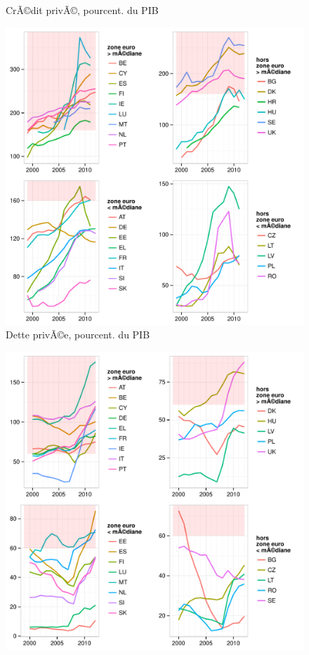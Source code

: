 \documentclass{article}\usepackage[]{graphicx}\usepackage[]{color}
\makeatletter
\def\maxwidth{ %
  \ifdim\Gin@nat@width>\linewidth
    \linewidth
  \else
    \Gin@nat@width
  \fi
}
\newenvironment{knitrout}{}{} %
\makeatother
\begin{document}
\begin{knitrout}
\begin{figure}[p]
{}

\caption[CrÃ©dit privÃ©, pourcent]{CrÃ©dit privÃ©, pourcent. du PIB\label{fig:byind7}}
\end{figure}

\begin{figure}[p]


{\centering \includegraphics[width=\maxwidth]{figure_graph/byind8} 

}

\caption[Dette privÃ©e, pourcent]{Dette privÃ©e, pourcent. du PIB\label{fig:byind8}}
\end{figure}

\begin{figure}[p]


{\centering \includegraphics[width=\maxwidth]{figure_graph/byind9} 

}
\end{figure}
\end{knitrout}
\end{document}
